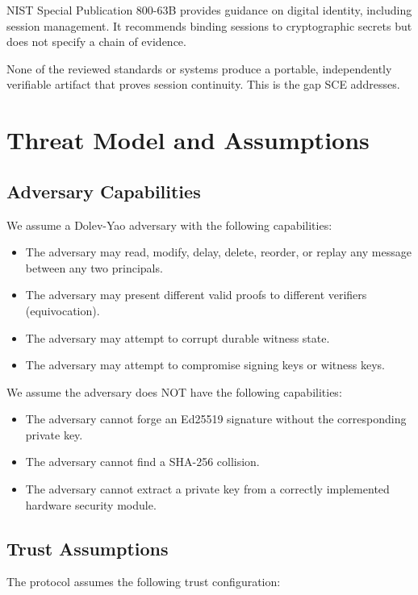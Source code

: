 \documentclass[11pt,a4paper]{article}
\begin{document}
NIST Special Publication 800-63B provides guidance on digital identity, including session management. It recommends binding sessions to cryptographic secrets but does not specify a chain of evidence.

None of the reviewed standards or systems produce a portable, independently verifiable artifact that proves session continuity. This is the gap SCE addresses.

\section{Threat Model and Assumptions}

\subsection{Adversary Capabilities}

We assume a Dolev-Yao adversary with the following capabilities:

\begin{itemize}
\item The adversary may read, modify, delay, delete, reorder, or replay any message between any two principals.
\item The adversary may present different valid proofs to different verifiers (equivocation).
\item The adversary may attempt to corrupt durable witness state.
\item The adversary may attempt to compromise signing keys or witness keys.
\end{itemize}

We assume the adversary does NOT have the following capabilities:

\begin{itemize}
\item The adversary cannot forge an Ed25519 signature without the corresponding private key.
\item The adversary cannot find a SHA-256 collision.
\item The adversary cannot extract a private key from a correctly implemented hardware security module.
\end{itemize}

\subsection{Trust Assumptions}

The protocol assumes the following trust configuration:
\end{document}
